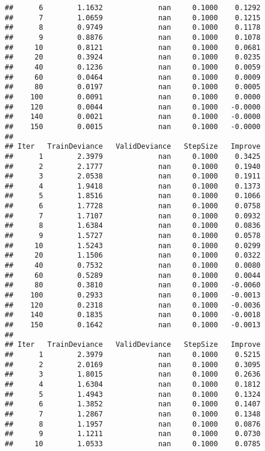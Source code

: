 \documentclass[]{article}
\begin{document}
\begin{verbatim}
##      6        1.1632             nan     0.1000    0.1292
##      7        1.0659             nan     0.1000    0.1215
##      8        0.9749             nan     0.1000    0.1178
##      9        0.8876             nan     0.1000    0.1078
##     10        0.8121             nan     0.1000    0.0681
##     20        0.3924             nan     0.1000    0.0235
##     40        0.1236             nan     0.1000    0.0059
##     60        0.0464             nan     0.1000    0.0009
##     80        0.0197             nan     0.1000    0.0005
##    100        0.0091             nan     0.1000    0.0000
##    120        0.0044             nan     0.1000   -0.0000
##    140        0.0021             nan     0.1000   -0.0000
##    150        0.0015             nan     0.1000   -0.0000
## 
## Iter   TrainDeviance   ValidDeviance   StepSize   Improve
##      1        2.3979             nan     0.1000    0.3425
##      2        2.1777             nan     0.1000    0.1940
##      3        2.0538             nan     0.1000    0.1911
##      4        1.9418             nan     0.1000    0.1373
##      5        1.8516             nan     0.1000    0.1066
##      6        1.7728             nan     0.1000    0.0758
##      7        1.7107             nan     0.1000    0.0932
##      8        1.6384             nan     0.1000    0.0836
##      9        1.5727             nan     0.1000    0.0578
##     10        1.5243             nan     0.1000    0.0299
##     20        1.1506             nan     0.1000    0.0322
##     40        0.7532             nan     0.1000    0.0080
##     60        0.5289             nan     0.1000    0.0044
##     80        0.3810             nan     0.1000   -0.0060
##    100        0.2933             nan     0.1000   -0.0013
##    120        0.2318             nan     0.1000   -0.0036
##    140        0.1835             nan     0.1000   -0.0018
##    150        0.1642             nan     0.1000   -0.0013
## 
## Iter   TrainDeviance   ValidDeviance   StepSize   Improve
##      1        2.3979             nan     0.1000    0.5215
##      2        2.0169             nan     0.1000    0.3095
##      3        1.8015             nan     0.1000    0.2636
##      4        1.6304             nan     0.1000    0.1812
##      5        1.4943             nan     0.1000    0.1324
##      6        1.3852             nan     0.1000    0.1407
##      7        1.2867             nan     0.1000    0.1348
##      8        1.1957             nan     0.1000    0.0876
##      9        1.1211             nan     0.1000    0.0730
##     10        1.0533             nan     0.1000    0.0785

\end{verbatim}
\end{document}
